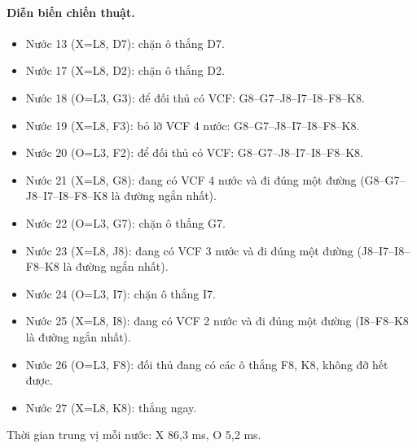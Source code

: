 \paragraph{Diễn biến chiến thuật.}
\begin{itemize}\small
\setlength{\itemsep}{0pt}
  \item Nước 13 (X=L8, D7): chặn ô thắng D7.
  \item Nước 17 (X=L8, D2): chặn ô thắng D2.
  \item Nước 18 (O=L3, G3): để đối thủ có VCF: G8--G7--J8--I7--I8--F8--K8.
  \item Nước 19 (X=L8, F3): bỏ lỡ VCF 4 nước: G8--G7--J8--I7--I8--F8--K8.
  \item Nước 20 (O=L3, F2): để đối thủ có VCF: G8--G7--J8--I7--I8--F8--K8.
  \item Nước 21 (X=L8, G8): đang có VCF 4 nước và đi đúng một đường (G8--G7--J8--I7--I8--F8--K8 là đường ngắn nhất).
  \item Nước 22 (O=L3, G7): chặn ô thắng G7.
  \item Nước 23 (X=L8, J8): đang có VCF 3 nước và đi đúng một đường (J8--I7--I8--F8--K8 là đường ngắn nhất).
  \item Nước 24 (O=L3, I7): chặn ô thắng I7.
  \item Nước 25 (X=L8, I8): đang có VCF 2 nước và đi đúng một đường (I8--F8--K8 là đường ngắn nhất).
  \item Nước 26 (O=L3, F8): đối thủ đang có các ô thắng F8, K8, không đỡ hết được.
  \item Nước 27 (X=L8, K8): thắng ngay.
\end{itemize}
Thời gian trung vị mỗi nước: X 86,3 ms, O 5,2 ms.
\clearpage

